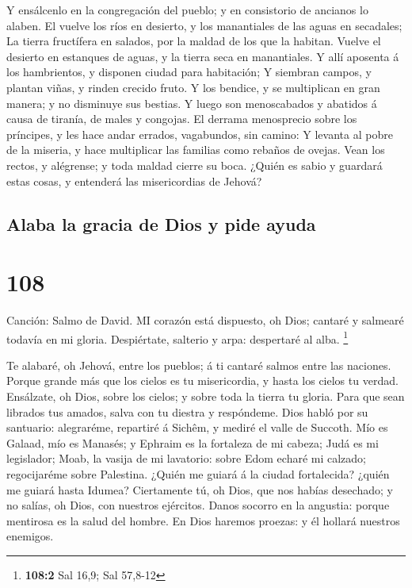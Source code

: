  Y ensálcenlo en la congregación del pueblo; y en
consistorio de ancianos lo alaben.  El vuelve los ríos en
desierto, y los manantiales de las aguas en secadales;  La
tierra fructífera en salados, por la maldad de los que la habitan.
 Vuelve el desierto en estanques de aguas, y la tierra seca
en manantiales.  Y allí aposenta á los hambrientos, y
disponen ciudad para habitación;  Y siembran campos, y
plantan viñas, y rinden crecido fruto.  Y los bendice, y se
multiplican en gran manera; y no disminuye sus bestias.  Y
luego son menoscabados y abatidos á causa de tiranía, de males y
congojas.  El derrama menosprecio sobre los príncipes, y
les hace andar errados, vagabundos, sin camino:  Y levanta
al pobre de la miseria, y hace multiplicar las familias como rebaños de
ovejas.  Vean los rectos, y alégrense; y toda maldad cierre
su boca.  ¿Quién es sabio y guardará estas cosas, y
entenderá las misericordias de Jehová?

\hypertarget{alaba-la-gracia-de-dios-y-pide-ayuda}{%
\subsection{Alaba la gracia de Dios y pide
ayuda}\label{alaba-la-gracia-de-dios-y-pide-ayuda}}

\hypertarget{section-107}{%
\section{108}\label{section-107}}

 Canción: Salmo de David. MI corazón está dispuesto, oh
Dios; cantaré y salmearé todavía en mi gloria.  Despiértate,
salterio y arpa: despertaré al alba. \footnote{\textbf{108:2} Sal 16,9;
  Sal 57,8-12}

 Te alabaré, oh Jehová, entre los pueblos; á ti cantaré
salmos entre las naciones.  Porque grande más que los cielos
es tu misericordia, y hasta los cielos tu verdad. 
Ensálzate, oh Dios, sobre los cielos; y sobre toda la tierra tu gloria.
 Para que sean librados tus amados, salva con tu diestra y
respóndeme.  Dios habló por su santuario: alegraréme,
repartiré á Sichêm, y mediré el valle de Succoth.  Mío es
Galaad, mío es Manasés; y Ephraim es la fortaleza de mi cabeza; Judá es
mi legislador;  Moab, la vasija de mi lavatorio: sobre Edom
echaré mi calzado; regocijaréme sobre Palestina.  ¿Quién me
guiará á la ciudad fortalecida? ¿quién me guiará hasta Idumea?
 Ciertamente tú, oh Dios, que nos habías desechado; y no
salías, oh Dios, con nuestros ejércitos.  Danos socorro en
la angustia: porque mentirosa es la salud del hombre.  En
Dios haremos proezas: y él hollará nuestros enemigos.

